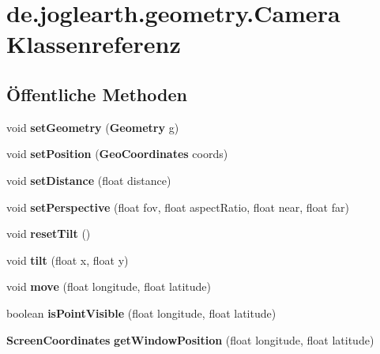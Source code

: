 \section{de.\-joglearth.\-geometry.\-Camera \-Klassenreferenz}
\label{classde_1_1joglearth_1_1geometry_1_1_camera}
\subsection*{Öffentliche \-Methoden}
\begin{DoxyCompactItemize}
\item 
void {\bfseries set\-Geometry} ({\bf \-Geometry} g)\label{classde_1_1joglearth_1_1geometry_1_1_camera_a7a517b53cbcfabacfeaed8fd6c8b5b63}

\item 
void {\bfseries set\-Position} ({\bf \-Geo\-Coordinates} coords)\label{classde_1_1joglearth_1_1geometry_1_1_camera_accb57080d3b54b039dd2c319888456d0}

\item 
void {\bfseries set\-Distance} (float distance)\label{classde_1_1joglearth_1_1geometry_1_1_camera_a91501d291640449b54807bf43e5ab497}

\item 
void {\bfseries set\-Perspective} (float fov, float aspect\-Ratio, float near, float far)\label{classde_1_1joglearth_1_1geometry_1_1_camera_aaf3be68eef79b33d4660c6fd525c92f2}

\item 
void {\bfseries reset\-Tilt} ()\label{classde_1_1joglearth_1_1geometry_1_1_camera_ab06fa6de4a7d086eea9d11ed94936b8c}

\item 
void {\bfseries tilt} (float x, float y)\label{classde_1_1joglearth_1_1geometry_1_1_camera_a7c04c717c5ec8c97c0b1ecc274470402}

\item 
void {\bfseries move} (float longitude, float latitude)\label{classde_1_1joglearth_1_1geometry_1_1_camera_aaeb2da7bffd20340f028c0a7ceb60be9}

\item 
boolean {\bfseries is\-Point\-Visible} (float longitude, float latitude)\label{classde_1_1joglearth_1_1geometry_1_1_camera_a2b521b573c3d26ef15cdf5ae8d7fb455}

\item 
{\bf \-Screen\-Coordinates} {\bfseries get\-Window\-Position} (float longitude, float latitude)\label{classde_1_1joglearth_1_1geometry_1_1_camera_a041be2bdb6da8e78bd306f415d20a332}


\end{DoxyCompactItemize}
